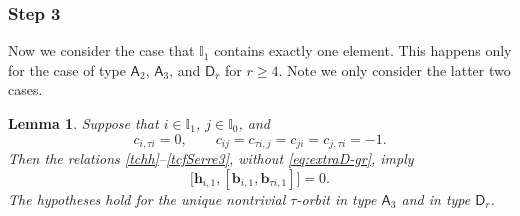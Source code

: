 \documentclass[11pt,reqno]{amsart}
\numberwithin{equation}{section}
\newtheorem{lem}[thm]{Lemma}
\theoremstyle{definition}
\theoremstyle{remark}
\newcommand{\bb}{\mathbf{b}}
\newcommand{\bh}{\mathbf{h}}
\newcommand{\gge}{\geqslant}
\newcommand{\I}{{\mathbb I}}
\begin{document}
\subsubsection*{\bf Step 3}
Now we consider the case that $\I_1$ contains exactly one element. This happens only for the case of type $\mathsf A_2$, $\mathsf A_3$, and $\mathsf D_r$ for $r\gge 4$. Note we only consider the latter two cases. 
\begin{lem}\label{lem:extraD-redundant-gr}
Suppose that $i\in\I_1$, $j\in\I_0$, and
\begin{equation}\label{eq:common-fixed-neighbor}
 c_{i,\tau i}=0,\qquad
 c_{ij}=c_{\tau i,j}=c_{ji}=c_{j,\tau i}=-1.
\end{equation}
Then the relations \eqref{tchh}--\eqref{tcfSerre3}, without
\eqref{eq:extraD-gr}, imply
\begin{equation}\label{eq:extraD-gr}
\big[\bh_{i,1},[\bb_{i,1},\bb_{\tau i,1}]\big]=0.
\end{equation}
The hypotheses hold for the unique nontrivial $\tau$-orbit in type
$\mathsf A_3$ and in type $\mathsf D_r$.
\end{lem}
\end{document}
